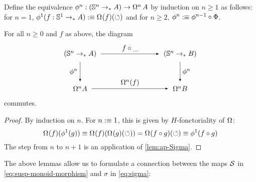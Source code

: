 \documentclass[english,a4]{article}
\newcommand{\ptdto}{\to_\ast}%
\begin{document}
Define the equivalence $\phi^n: (\Sn n \ptdto A) \to \loopspace n A$ by induction on $n\geq 1$
as follows: for $n=1$, $\phi^1(f:\Sc \ptdto A) \defequi \loopspace\null
(f)(\Sloop)$ and for $n\geq 2$, $\phi^n \mathrel{\hbox{:}\mkern-5mu\equiv} \phi^{n-1} \circ
\Phi$.
\begin{corollary}\label{lem:iterated-ap-Sigma}
    For all $n \geq 0$ and $f$ as above, the diagram
    \begin{equation}
    \begin{tikzpicture}[x=5cm,y=-1.75cm,baseline=(current bounding box.center)]
    \tikzset{arrow/.style={shorten >=0.1cm,shorten <=.1cm,-latex}}
    \node (A) at (0,0) {$(\Sn n \to_* A)$}; 
    \node (D) at (1,0) {$(\Sn n \to_* B)$}; 
    \node (B) at (0,1) {$\Omega^n A$}; 
    \node (C) at (1,1) {$\Omega^n B$}; 
    
    \draw[arrow] (A) to node [above] {$f \circ \_$} (D);
    \draw[arrow] (A) to node [left] {$\phi^n$} (B);
    \draw[arrow] (B) to node [above] {$\Omega^n(f)$} (C);
    \draw[arrow] (D) to node [right] {$\phi^n$} (C);
    \end{tikzpicture}
    \end{equation}
    commutes.
\end{corollary}
\begin{proof}
  By induction on $n$. For $n\mathrel{\hbox{:}\mkern-5mu\equiv} 1$, this is given by $H$-fonctoriality of
  $\loopspace\null$:
  \begin{displaymath}
    \loopspace \null (f) (\phi^1 (g)) \jdeq \loopspace\null(f)(\loopspace\null(g)(\Sloop))
    =\loopspace\null(f\circ g)(\Sloop) \jdeq \phi^1(f\circ g)
  \end{displaymath}
  The step from $n$ to $n+1$ is an application of \cref{lem:ap-Sigma}.
\end{proof}


The above lemmas allow us to formulate a connection between the maps $\operatorname{\mathcal S}$ in \eqref{eq:susp-monoid-morphism} and $\sigma$ in \eqref{eq:sigma}:
\end{document}
